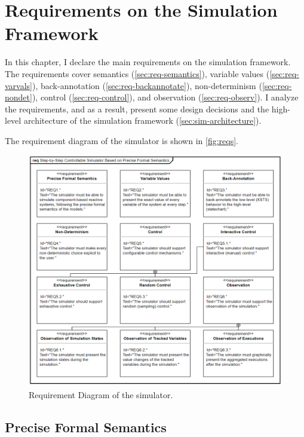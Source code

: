 \chapter{Requirements on the Simulation Framework} \label{ch:reqs}

In this chapter, I declare the main requirements on the simulation framework. The requirements cover semantics (\autoref{sec:req-semantics}), variable values (\autoref{sec:req-varvals}), back-annotation (\autoref{sec:req-backannotate}), non-determinism (\autoref{sec:req-nondet}), control (\autoref{sec:req-control}), and observation (\autoref{sec:req-observ}). I analyze the requirements, and as a result, present some design decisions and the high-level architecture of the simulation framework (\autoref{sec:sim-architecture}).

The requirement diagram of the simulator is shown in \autoref{fig:reqs}.

\begin{figure}[htbp]
	\centering
	\includegraphics[width=\textwidth, keepaspectratio]{figures/reqs.png}
	\caption{Requirement Diagram of the simulator.}
	\label{fig:reqs}
\end{figure}

\section{Precise Formal Semantics}\label{sec:req-semantics}

